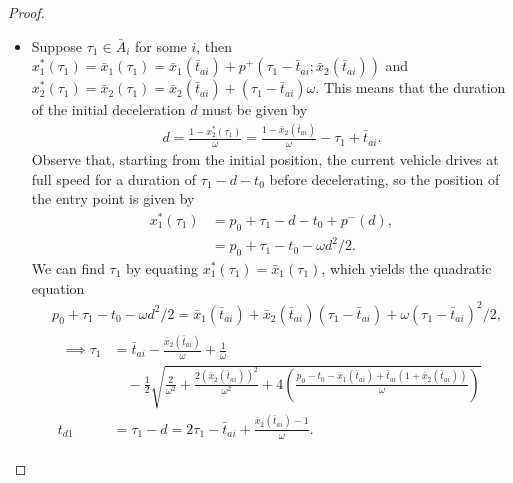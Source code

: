\documentclass[a4paper]{article}
\theoremstyle{definition}
\theoremstyle{plain}
\begin{document}
\begin{proof}
\begin{itemize}
    \item Suppose $\tau_{1} \in \bar{A}_{i}$ for some $i$, then
          $x_{1}^{*}(\tau_{1}) = \bar{x}_{1}(\tau_{1}) = \bar{x}_{1}(\bar{t}_{ai}) + p^{+}(\tau_{1} - \bar{t}_{ai}; \bar{x}_{2}(\bar{t}_{ai})) $
          and
          $x_{2}^{*}(\tau_{1}) = \bar{x}_{2}(\tau_{1}) = \bar{x}_{2}(\bar{t}_{ai}) + (\tau_{1} - \bar{t}_{ai}) \omega$.
          This means that the duration of the initial deceleration $d$ must be
          given by
          \begin{align*}
            d = \frac{1 - x^{*}_{2}(\tau_{1})}{\omega} = \frac{1 - \bar{x}_{2}(\bar{t}_{ai})}{\omega} - \tau_{1} + \bar{t}_{ai} .
          \end{align*}
          Observe that, starting from the initial position, the current vehicle
          drives at full speed for a duration of $\tau_{1} - d - t_{0}$ before
          decelerating, so the position of the entry point is given by
          \begin{align*}
            x^{*}_{1}(\tau_{1}) &= p_{0} + \tau_{1} - d - t_{0} + p^{-}(d) , \\
                    &= p_{0} + \tau_{1} - t_{0} - \omega d^{2} / 2 .
          \end{align*}
          We can find $\tau_{1}$ by equating $x^{*}_{1}(\tau_{1}) = \bar{x}_{1}(\tau_{1})$,
          which yields the quadratic equation
          \begin{align*}
            &p_{0} + \tau_{1} - t_{0} - \omega d^{2} / 2 = \bar{x}_{1}(\bar{t}_{ai}) + \bar{x}_{2}(\bar{t}_{ai})(\tau_{1} - \bar{t}_{ai}) + \omega (\tau_{1} - \bar{t}_{ai})^{2} / 2 , \\
            &\begin{aligned}
            \; \implies \tau_{1} &= \bar{t}_{ai} -\frac{\bar{x}_{2}(\bar{t}_{ai})}{\omega} + \frac{1}{\omega} \\
            &\quad- \frac{1}{2}\sqrt{\frac{2}{\omega^{2}} + \frac{2(\bar{x}_{2}(\bar{t}_{ai}))^{2}}{\omega^{2}} + 4\left( \frac{p_{0} - t_{0} - \bar{x}_{1}(\bar{t}_{ai}) + \bar{t}_{ai}(1 + \bar{x}_{2}(\bar{t}_{ai}))}{\omega} \right)} \\
            t_{d1} &= \tau_{1} - d = 2 \tau_{1} - \bar{t}_{ai} + \frac{\bar{x}_{2}(\bar{t}_{ai}) - 1}{\omega} .
            \end{aligned}
          \end{align*}



\end{itemize}
\end{proof}
\end{document}
